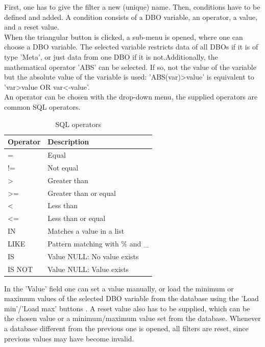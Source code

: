 \documentclass[10pt,letterpaper,extrafontsizes]{memoir}
\begin{document}
First, one has to give the filter a new (unique) name. Then, conditions have to be defined and added. A condition consists of a DBO variable, an operator, a value, and a reset value. \\

When the triangular button is clicked, a sub-menu is opened, where one can choose a DBO variable. The selected variable restricts data of all DBOs if it is of type 'Meta', or just data from one DBO if it is not.Additionally, the mathematical operator 'ABS' can be selected. If so, not the value of the variable but the absolute value of the variable is used: 'ABS(var)>value' is equivalent to 'var>value OR var<-value'. \\

An operator can be chosen with the drop-down menu, the supplied operators are common SQL operators.

\begin{table}[H]
  \center
  \begin{tabular}{ | l | l |}
    \hline
    \textbf{Operator} & \textbf{Description} \\ \hline
    = & Equal \\ \hline
    != & Not equal \\ \hline
    > & Greater than \\ \hline
    >= & Greater than or equal \\ \hline
    < & Less than \\ \hline
    <= & Less than or equal \\ \hline
    IN & Matches a value in a list \\ \hline
    LIKE & Pattern matching with \% and \_ \\ \hline
    IS & Value NULL: No value exists \\ \hline
    IS NOT & Value NULL: Value exists \\
    \hline
  \end{tabular}
  \caption{SQL operators}
\end{table}

In the 'Value' field one can set a value manually, or load the minimum or maximum values of the selected DBO variable from the database using the 'Load min'/'Load max' buttons . A reset value also has to be supplied, which can be the chosen value or a minimum/maximum value set from the database.  Whenever a database different from the previous one is opened, all filters are reset, since previous values may have become invalid.\\
\end{document}
